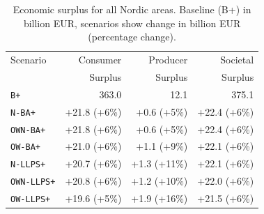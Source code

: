 \begin{table}[htbp]
\centering
\caption{Economic surplus for all Nordic areas. Baseline (B+) in billion EUR, scenarios show change in billion EUR (percentage change).}
\label{tab:surplus_nordic}
\begin{tabular}{lrrr}
\toprule
Scenario & Consumer & Producer & Societal \\
 & Surplus & Surplus & Surplus \\
\midrule
\multicolumn{1}{l}{\texttt{B+}} & 363.0 & 12.1 & 375.1 \\
\midrule
\texttt{N-BA+} & +21.8 (+6\%) & +0.6 (+5\%) & +22.4 (+6\%) \\
\texttt{OWN-BA+} & +21.8 (+6\%) & +0.6 (+5\%) & +22.4 (+6\%) \\
\texttt{OW-BA+} & +21.0 (+6\%) & +1.1 (+9\%) & +22.1 (+6\%) \\
\midrule
\texttt{N-LLPS+} & +20.7 (+6\%) & +1.3 (+11\%) & +22.1 (+6\%) \\
\texttt{OWN-LLPS+} & +20.8 (+6\%) & +1.2 (+10\%) & +22.0 (+6\%) \\
\texttt{OW-LLPS+} & +19.6 (+5\%) & +1.9 (+16\%) & +21.5 (+6\%) \\
\bottomrule
\end{tabular}
\end{table}
